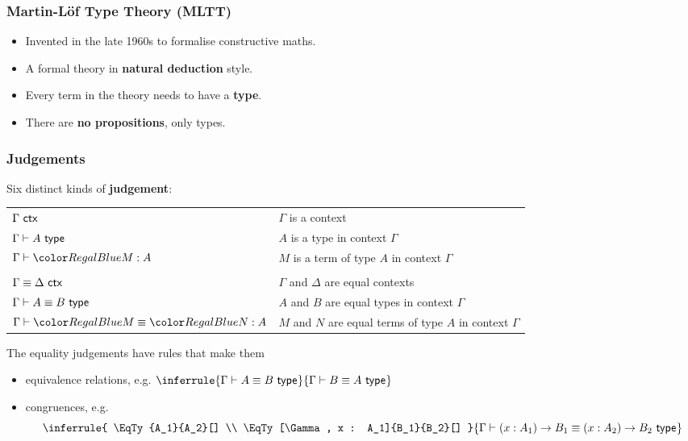 \documentclass[handout]{beamer} %
\begin{document}
\begin{frame}
  \frametitle{Martin-L\"of Type Theory (MLTT)}

  \begin{itemize}
    \item Invented in the late 1960s to formalise constructive maths.
    \item A formal theory in \textbf{natural deduction} style.
    \item Every term in the theory needs to have a \textbf{type}.
    \item There are \textbf{no propositions}, only types.
  \end{itemize}
  
  \begin{center}
  \end{center}
\end{frame}

\begin{frame}
  \frametitle{Judgements}
  
  Six distinct kinds of \textbf{judgement}:
  \begin{center}
    \begin{tabular}{ll}
      $\Gamma\ \mathsf{ctx}_{}$    & $\Gamma$ is a context \\
      $\IsTy{A}[]$        & $A$ is a type in context $\Gamma$ \\
      $\IsTm{M}{A}$       & $M$ is a term of type $A$ in context $\Gamma$ \\
      & \\
      $\Gamma \equiv \Delta\ \mathsf{ctx}_{}$  & $\Gamma$ and $\Delta$ are equal contexts \\
      $\EqTy{A}{B}[]$             & $A$ and $B$ are equal types in context $\Gamma$ \\
      $\EqTm{M}{N}{A}$          & $M$ and $N$ are equal terms of type $A$ in context $\Gamma$
    \end{tabular}
  \end{center}
  The equality judgements have rules that make them
  \begin{itemize}
    \item equivalence relations, e.g. $
        \inferrule{
          \EqTy{A}{B}[]
        }{
          \EqTy{B}{A}[]
        }
    $
    \item congruences, e.g. \[
      \inferrule{
        \EqTy{A_1}{A_2}[] \\
        \EqTy[\Gamma, x : A_1]{B_1}{B_2}[]
      }{
        \EqTy{\Fn{x}{A_1}{B_1}}{\Fn{x}{A_2}{B_2}}[]
      }
    \]
  \end{itemize}
\end{frame}
\end{document}
